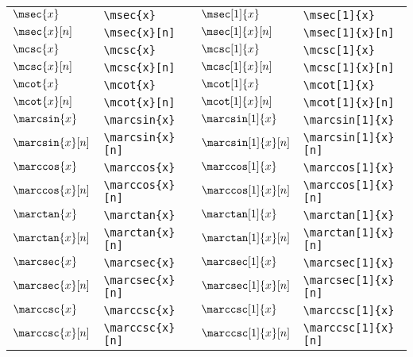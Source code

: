 \documentclass[10pt, a4paper]{article}
\begin{document}
\begin{center}
\begin{tabular}{ll|ll}
		$ \msec{x} $ & \texttt{\textbackslash msec\{x\}} & $ \msec[1]{x} $ & \texttt{\textbackslash msec[1]\{x\}}\\
		$ \msec{x}[n] $ & \texttt{\textbackslash msec\{x\}[n]} & $ \msec[1]{x}[n] $ & \texttt{\textbackslash msec[1]\{x\}[n]}\\
		$ \mcsc{x} $ & \texttt{\textbackslash mcsc\{x\}} & $ \mcsc[1]{x} $ & \texttt{\textbackslash mcsc[1]\{x\}}\\
		$ \mcsc{x}[n] $ & \texttt{\textbackslash mcsc\{x\}[n]} & $ \mcsc[1]{x}[n] $ & \texttt{\textbackslash mcsc[1]\{x\}[n]}\\
		$ \mcot{x} $ & \texttt{\textbackslash mcot\{x\}} & $ \mcot[1]{x} $ & \texttt{\textbackslash mcot[1]\{x\}}\\
		$ \mcot{x}[n] $ & \texttt{\textbackslash mcot\{x\}[n]} & $ \mcot[1]{x}[n] $ & \texttt{\textbackslash mcot[1]\{x\}[n]}\\
		$ \marcsin{x} $ & \texttt{\textbackslash marcsin\{x\}} & $ \marcsin[1]{x} $ & \texttt{\textbackslash marcsin[1]\{x\}}\\
		$ \marcsin{x}[n] $ & \texttt{\textbackslash marcsin\{x\}[n]} & $ \marcsin[1]{x}[n] $ & \texttt{\textbackslash marcsin[1]\{x\}[n]}\\
		$ \marccos{x} $ & \texttt{\textbackslash marccos\{x\}} & $ \marccos[1]{x} $ & \texttt{\textbackslash marccos[1]\{x\}}\\
		$ \marccos{x}[n] $ & \texttt{\textbackslash marccos\{x\}[n]} & $ \marccos[1]{x}[n] $ & \texttt{\textbackslash marccos[1]\{x\}[n]}\\
		$ \marctan{x} $ & \texttt{\textbackslash marctan\{x\}} & $ \marctan[1]{x} $ & \texttt{\textbackslash marctan[1]\{x\}}\\
		$ \marctan{x}[n] $ & \texttt{\textbackslash marctan\{x\}[n]} & $ \marctan[1]{x}[n] $ & \texttt{\textbackslash marctan[1]\{x\}[n]}\\
		$ \marcsec{x} $ & \texttt{\textbackslash marcsec\{x\}} & $ \marcsec[1]{x} $ & \texttt{\textbackslash marcsec[1]\{x\}}\\
		$ \marcsec{x}[n] $ & \texttt{\textbackslash marcsec\{x\}[n]} & $ \marcsec[1]{x}[n] $ & \texttt{\textbackslash marcsec[1]\{x\}[n]}\\
		$ \marccsc{x} $ & \texttt{\textbackslash marccsc\{x\}} & $ \marccsc[1]{x} $ & \texttt{\textbackslash marccsc[1]\{x\}}\\
		$ \marccsc{x}[n] $ & \texttt{\textbackslash marccsc\{x\}[n]} & $ \marccsc[1]{x}[n] $ & \texttt{\textbackslash marccsc[1]\{x\}[n]}\\

\end{tabular}
\end{center}
\end{document}
